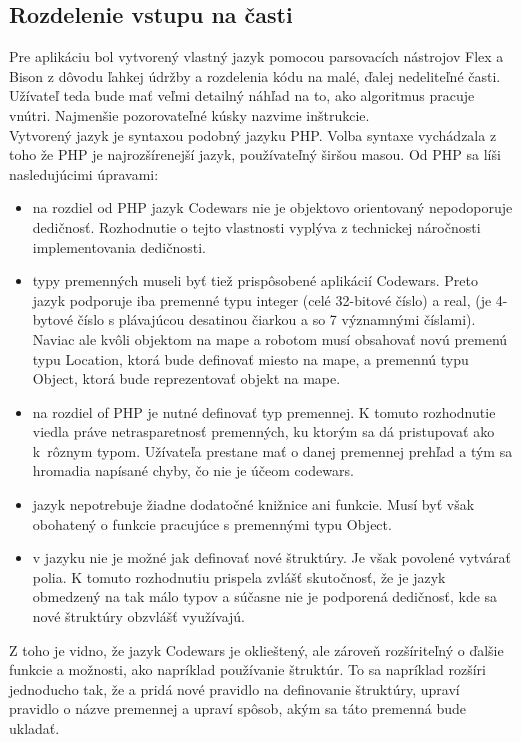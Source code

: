 \subsection{Rozdelenie vstupu na časti}
Pre aplikáciu bol vytvorený vlastný jazyk pomocou parsovacích nástrojov Flex a Bison z dôvodu ľahkej údržby a rozdelenia kódu na malé, ďalej nedeliteľné časti. Užívateľ teda bude mať veľmi detailný náhľad na to, ako algoritmus pracuje vnútri. Najmenšie pozorovateľné kúsky nazvime inštrukcie.\\
Vytvorený jazyk je syntaxou podobný jazyku PHP. Volba syntaxe vychádzala z toho že PHP je najrozšírenejší jazyk, používateľný širšou masou. Od PHP sa líši nasledujúcimi úpravami:
\begin{itemize}
\item na rozdiel od PHP jazyk Codewars nie je objektovo orientovaný nepodoporuje dedičnosť. Rozhodnutie o tejto vlastnosti vyplýva z technickej náročnosti implementovania dedičnosti.
\item typy premenných museli byť tiež prispôsobené aplikácií Codewars. Preto jazyk podporuje iba premenné typu integer (celé 32-bitové číslo) a real, (je 4-bytové  číslo s plávajúcou desatinou čiarkou a so 7 významnými číslami). Naviac ale kvôli objektom na mape a robotom musí obsahovať novú premenú typu Location, ktorá bude definovať miesto na mape, a premennú typu Object, ktorá bude reprezentovať objekt na mape.
\item na rozdiel of PHP je nutné definovať typ premennej. K tomuto rozhodnutie viedla práve netrasparetnosť premenných, ku ktorým sa dá pristupovať ako k~rôznym typom. Užívateľa prestane mať o danej premennej prehľad a tým sa hromadia napísané chyby, čo nie je účeom codewars.
\item jazyk nepotrebuje žiadne dodatočné knižnice ani funkcie. Musí byť však obohatený o funkcie pracujúce s premennými typu Object.
\item v jazyku nie je možné jak definovať nové štruktúry. Je však povolené vytvárať polia. K tomuto rozhodnutiu prispela zvlášť skutočnosť, že je jazyk obmedzený na tak málo typov a súčasne nie je podporená dedičnosť, kde sa nové štruktúry obzvlášť využívajú.
\end{itemize}
Z toho je vidno, že jazyk Codewars je oklieštený, ale zároveň rozšíriteľný o ďalšie funkcie a možnosti, ako napríklad používanie štruktúr. To sa napríklad rozšíri jednoducho tak, že a pridá nové pravidlo na definovanie štruktúry, upraví pravidlo o názve premennej a upraví spôsob, akým sa táto premenná bude ukladať.%
